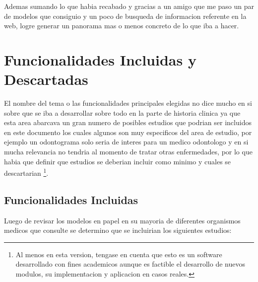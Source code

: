 Ademas sumando lo que habia recabado y gracias a un amigo que me paso un par de modelos 
que consiguio y un poco de busqueda de informacion referente en la web, logre generar un 
panorama mas o menos concreto de lo que iba a hacer.  



\section{Funcionalidades Incluidas y Descartadas}

El nombre del tema o las funcionalidades principales elegidas no dice mucho en 
si sobre que se iba a desarrollar sobre todo en la parte de historia clinica 
ya que esta area abarcava un gran numero de posibles estudios que podrian ser 
incluidos en este documento los cuales algunos son muy especificos del area
de estudio, por ejemplo un odontograma solo seria de interes para un medico
odontologo y en si mucha relevancia no tendria al momento de tratar otras 
enfermedades, por lo que habia que definir que estudios se deberian incluir 
como minimo y cuales se descartarian \footnote{Al menos en esta version, tengase en cuenta que 
esto es un software desarrollado con fines academicos aunque es factible el 
desarrollo de nuevos modulos, su implementacion y aplicacion en casos reales.}.


\subsection{Funcionalidades Incluidas}

Luego de revisar los modelos en papel en su mayoria de diferentes organismos
medicos que consulte se determino que se incluirian los siguientes estudios:


